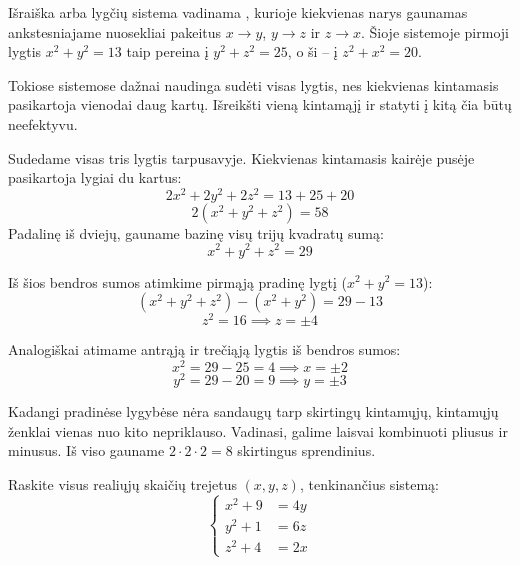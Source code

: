 \documentclass[11pt,a4paper]{scrartcl}
\begin{document}
\begin{solution}
Išraiška arba lygčių sistema vadinama , kurioje kiekvienas narys gaunamas ankstesniajame nuosekliai pakeitus $x \to y$, $y \to z$ ir $z \to x$. Šioje sistemoje pirmoji lygtis $x^2+y^2=13$ taip pereina į $y^2+z^2=25$, o ši -- į $z^2+x^2=20$.

Tokiose sistemose dažnai naudinga sudėti visas lygtis, nes kiekvienas kintamasis pasikartoja vienodai daug kartų. Išreikšti vieną kintamąjį ir statyti į kitą čia būtų neefektyvu.

Sudedame visas tris lygtis tarpusavyje. Kiekvienas kintamasis kairėje pusėje pasikartoja lygiai du kartus:
$$ 2x^2 + 2y^2 + 2z^2 = 13 + 25 + 20 $$
$$ 2(x^2 + y^2 + z^2) = 58 $$
Padalinę iš dviejų, gauname bazinę visų trijų kvadratų sumą:
$$ x^2 + y^2 + z^2 = 29 $$

Iš šios bendros sumos atimkime pirmąją pradinę lygtį ($x^2 + y^2 = 13$):
$$ (x^2 + y^2 + z^2) - (x^2 + y^2) = 29 - 13 $$
$$ z^2 = 16 \implies z = \pm 4 $$

Analogiškai atimame antrąją ir trečiąją lygtis iš bendros sumos:
$$ x^2 = 29 - 25 = 4 \implies x = \pm 2 $$
$$ y^2 = 29 - 20 = 9 \implies y = \pm 3 $$

Kadangi pradinėse lygybėse nėra sandaugų tarp skirtingų kintamųjų, kintamųjų ženklai vienas nuo kito nepriklauso. Vadinasi, galime laisvai kombinuoti pliusus ir minusus. Iš viso gauname $2 \cdot 2 \cdot 2 = 8$ skirtingus sprendinius.
\end{solution}


\begin{example}
Raskite visus realiųjų skaičių trejetus $(x,y,z)$, tenkinančius sistemą:
\[
\left\{\begin{aligned}
    x^2+9 &= 4y \\
    y^2+1 &= 6z \\
    z^2+4 &= 2x
\end{aligned}\right.
\]
\end{example}
\end{document}
